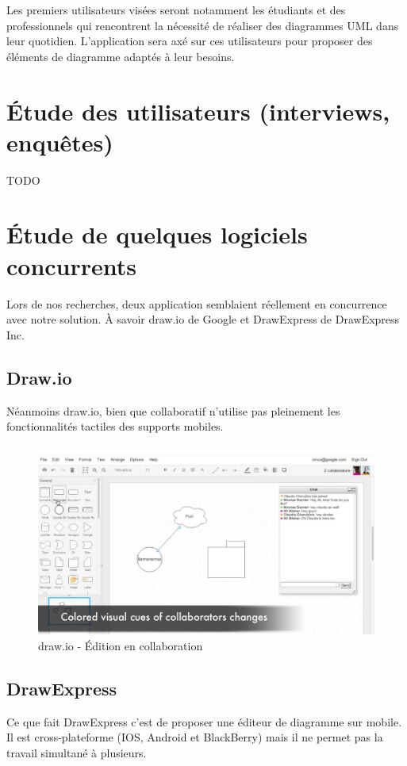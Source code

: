 \documentclass[a4paper,11pt]{article}
\begin{document}
Les premiers utilisateurs visées seront notamment les étudiants et des professionnels qui rencontrent la nécessité de réaliser des diagrammes UML dans leur quotidien.
L'application sera axé sur ces utilisateurs pour proposer des éléments de diagramme adaptés à leur besoins.

\section{Étude des utilisateurs (interviews, enquêtes)}
TODO

\newpage
\section{Étude de quelques logiciels concurrents}
Lors de nos recherches, deux application semblaient réellement en concurrence avec notre solution. À savoir draw.io de Google et DrawExpress de DrawExpress Inc.

\subsection{Draw.io}
Néanmoins draw.io, bien que collaboratif n'utilise pas pleinement les fonctionnalités tactiles des supports mobiles.

\begin{figure}[h]
	\centering
	\includegraphics[width=15cm]{img/drawio.PNG}
	\caption{draw.io - Édition en collaboration}
\end{figure}


\subsection{DrawExpress}
Ce que fait DrawExpress c’est de proposer une éditeur de diagramme sur mobile. Il est cross-plateforme (IOS, Android et BlackBerry) mais il ne permet pas la travail simultané à plusieurs.
\end{document}
